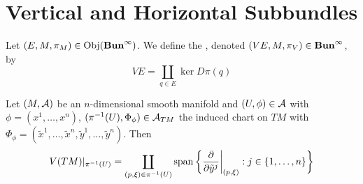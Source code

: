 \documentclass{book}
\begin{document}
	
	
	
	
	
	
	
	
	
	
	
	
	
	
	
	
	
	
	
	
	
	\newpage
	\section{Vertical and Horizontal Subbundles}
	
	\begin{defn}
		Let $(E, M, \pi_M) \in \operatorname{Obj}(\operatorname*{\text{\textbf{Bun}}^{\infty}})$. We define the , denoted $(VE, M, \pi_{V}) \in \operatorname*{\text{\textbf{Bun}}^{\infty}}$, by 
		$$VE = \coprod_{q \in E} \ker D\pi(q)$$
	\end{defn}
	
	
	\begin{ex}
		Let $(M, \mathcal{A})$ be an $n$-dimensional smooth manifold and $(U, \phi) \in \mathcal{A}$ with $\phi = (x^1, \ldots, x^n)$,  $(\pi^{-1}(U), \Phi_{\phi}) \in \mathcal{A}_{TM}$ the induced chart on $TM$ with $\Phi_{\phi} = (\tilde{x}^1, \ldots, \tilde{x}^n,  \tilde{y}^1, \ldots, \tilde{y}^n)$. Then 
		$$V(TM)|_{\pi^{-1}(U)} = \coprod_{(p, \xi) \in \pi^{-1}(U)} \operatorname{span} \bigg \{ \frac{\partial}{\partial \tilde{y}^j} \bigg|_{(p, \xi)}: j \in \{1, \ldots, n\} \bigg \}$$
	\end{ex}
	
\end{document}
